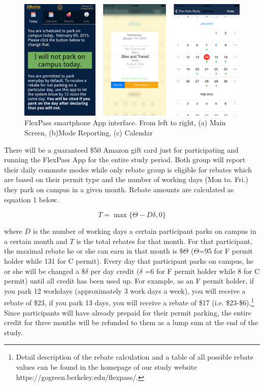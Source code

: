 \documentclass[preprint,12pt]{elsarticle}
\begin{document}
\begin{figure}[!htb]
\centering
\includegraphics[scale=0.8]{app_screens.png}
\caption{FlexPass smartphone App interface. From left to right, (a) Main Screen, (b)Mode Reporting, (c) Calendar}
\label{fig:app_screens}
\end{figure}

There will be a guaranteed \$50 Amazon gift card just for participating and running the FlexPass App for the entire study period. Both group will report their daily commute modes while only rebate group is eligible for rebates which are based on their permit type and the number of working days (Mon to. Fri.) they park on campus in a given month. Rebate amounts are calculated as equation 1 below.

\[T = \max \{ \Theta  - D\delta ,0\} \]

where $D$ is the number of working days a certain participant parks on campus in a certain month and $T$ is the total rebates for that month. For that participant, the maximal rebate he or she can earn in that month is $\$\Theta$ ($\Theta$=95 for F permit holder while 131 for C permit). Every day that participant parks on campus, he or she will be changed a $\$\delta$ per day credit ($\delta$ =6 for F permit holder while 8 for C permit) until all credit has been used up. For example, as an F permit holder, if you park 12 workdays (approximately 3 work days a week), you will receive a rebate of \$23, if you park 13 days, you will receive a rebate of \$17 (i.e. \$23-\$6).\footnote{Detail description of the rebate calculation and a table of all possible rebate values can be found in the homepage of our study website https://gogreen.berkeley.edu/flexpass/.} Since participants will have already prepaid for their permit parking, the entire credit for three months will be refunded to them as a lump sum at the end of the study. 
\end{document}
